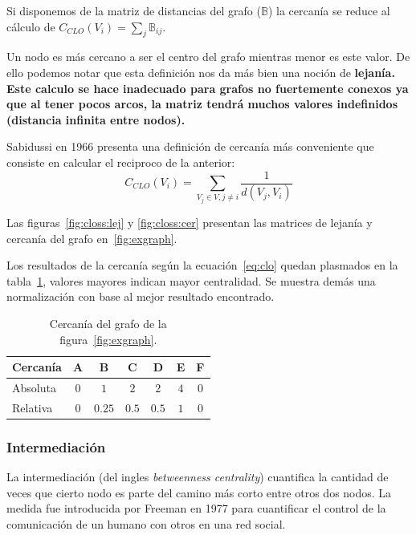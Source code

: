Si disponemos de la matriz de distancias del grafo ($\mathbb{B}$) la cercanía
se reduce al cálculo de $ C_{CLO}(V_i) = \sum_{j} \mathbb{B}_{ij} $.

Un nodo es más cercano a ser el centro del grafo mientras menor es este valor.
De ello podemos notar que esta definición nos da más bien una noción de
\bf{lejanía}. Este calculo se hace inadecuado para grafos no fuertemente
conexos ya que al tener pocos arcos, la matriz tendrá muchos valores indefinidos
(distancia infinita entre nodos). 

Sabidussi en 1966\cite{sabidussi1966centrality} presenta una definición
de cercanía más conveniente que consiste en calcular el reciproco de la
anterior: 
\begin{equation}
  \label{eq:clo}
  C_{CLO}(V_i) = \sum_{V_j\in V, j\neq i} \frac{1}{d(V_j, V_i)}
\end{equation}

Las figuras~\ref{fig:closs:lej} y \ref{fig:closs:cer} presentan las matrices de
lejanía y cercanía del grafo en~\ref{fig:exgraph}.



Los resultados de la cercanía según la ecuación~\ref{eq:clo}
quedan plasmados en la tabla~\ref{tab:closeness},
valores mayores indican mayor centralidad. Se muestra demás una normalización
con base al mejor resultado encontrado.
\begin{table}[htpb]
  \centering
  \begin{tabular}{|l|c|c|c|c|c|c|}
    \hline
    Cercanía &  A  &  B  &  C  &  D  &  E  &  F  \\\hline
    Absoluta & $0$ & $1$ & $2$ & $2$ & $4$ & $0$ \\\hline
    Relativa & $0$ & $0.25$ & $0.5$ & $0.5$ & $1$ & $0$ \\\hline
  \end{tabular}
  \caption{Cercanía del grafo de la figura~\ref{fig:exgraph}.}
  \label{tab:closeness}
\end{table}

\subsubsection{Intermediación}\label{ea:cent:bet}
La intermediación (del ingles \emph{betweenness centrality}) cuantifica la
cantidad de veces que cierto nodo es parte del camino más corto entre otros dos
nodos.
La medida fue introducida por Freeman en 1977\cite{freeman1977set} para
cuantificar el control de la comunicación de un humano con otros en una red
social. 

